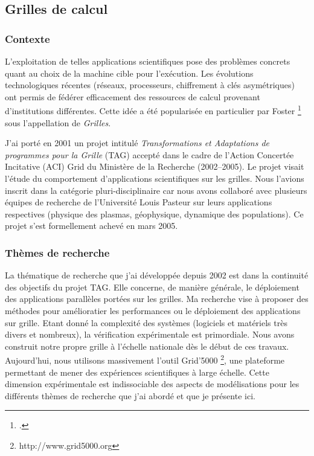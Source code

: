 \documentclass[11pt]{article}
\begin{document}
 
\subsection{Grilles de calcul}

\subsubsection{Contexte}
\label{sc:actuel-contexte}
L'exploitation de telles applications scientifiques pose des problèmes concrets quant au choix de la machine cible pour l'exécution. 
Les évolutions technologiques récentes (réseaux, processeurs, chiffrement à clés asymétriques) ont permis de fédérer 
efficacement des ressources de calcul provenant d'institutions différentes.
Cette idée a été popularisée en particulier par Foster \footcite{Foster97,Foster98} sous l'appellation de \emph{Grilles}.

J'ai porté en 2001 un projet intitulé \textit{Transformations et Adaptations de programmes pour la Grille} (TAG)
accepté dans le cadre de l'Action Concertée Incitative (ACI) Grid du Ministère de la Recherche (2002--2005).
Le projet visait l'étude du comportement d'applications scientifiques sur les grilles.
Nous l'avions inscrit dans la catégorie pluri-disciplinaire car nous avons collaboré avec plusieurs
équipes de recherche de l'Université Louis Pasteur sur leurs applications respectives
(physique des plasmas, géophysique, dynamique des populations). 
Ce projet s'est formellement achevé en mars 2005.


\subsubsection{Thèmes de recherche}

La thématique de recherche que j'ai développée depuis 2002 est dans la continuité des objectifs du
projet TAG. Elle concerne, de manière générale, le déploiement des applications parallèles portées 
sur les grilles. Ma recherche vise à proposer des méthodes pour amélioratier les performances ou 
le déploiement des applications sur grille.
Etant donné la complexité des systèmes (logiciels et matériels très divers et nombreux), la 
vérification expérimentale est primordiale. Nous avons construit notre propre grille à l'échelle nationale
dès le début de ces travaux. Aujourd'hui, nous utilisons massivement l'outil Grid'5000%
\footnote{http://www.grid5000.org}, une plateforme
permettant de mener des expériences scientifiques à large échelle.
Cette dimension expérimentale est indissociable des aspects de modélisations pour les différents
thèmes de recherche que j'ai abordé et que je présente ici.
\end{document}
